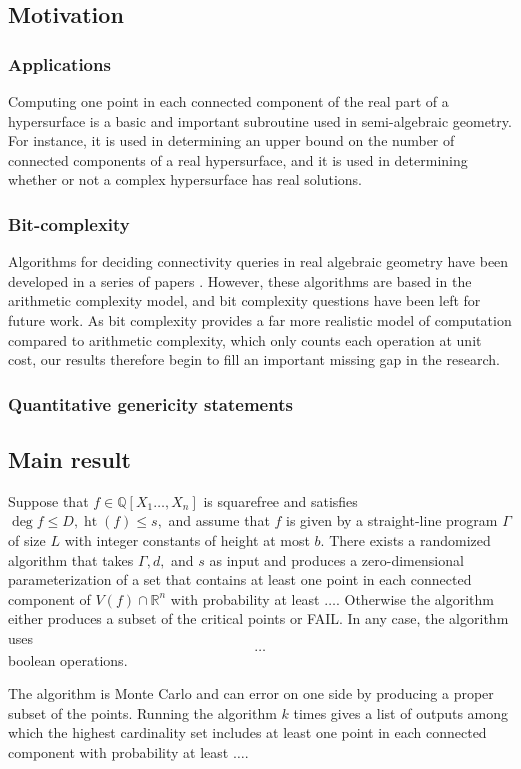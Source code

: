 \documentclass[sigconf]{acmart}
\DeclareMathOperator{\htt}{ht}
\def\Q{\mathbb{Q}}
\def\R{\mathbb{R}}
\begin{document}
\subsection{Motivation}
%
\subsubsection{Applications}
%
Computing one point in each connected component of the real part of a hypersurface is a basic and important subroutine used in semi-algebraic geometry. For instance, it is used in determining an upper bound on the number of connected components of a real hypersurface, and it is used in determining whether or not a complex hypersurface has real solutions. 
\subsubsection{Bit-complexity}
Algorithms for deciding connectivity queries in real algebraic geometry have been developed in a series of papers \cite{a,b,c,d}. However, these algorithms are based in the arithmetic complexity model, and bit complexity questions have been left for future work. As bit complexity provides a far more realistic model of computation compared to arithmetic complexity,  which only counts each operation at unit cost, our results therefore begin to fill an important missing gap in the research. 
\subsubsection{Quantitative genericity statements}
%
\subsection{Main result}
%
\begin{theorem}
Suppose that $f\in\Q[X_1\hdots,X_n]$ is squarefree and satisfies $\deg f \leq D, \htt(f) \leq s,$ and assume that $f$ is given by a straight-line program $\Gamma$ of size $L$ with integer constants of height at most $b.$ There exists a randomized algorithm that takes $\Gamma, d,$ and $s$ as input and produces a zero-dimensional parameterization of a set that contains at least one point in each connected component of $V(f) \cap \R^n$ with probability at least $\hdots$. Otherwise the algorithm either produces a subset of the critical points or FAIL. In any case, the algorithm uses 
\[
\hdots  
\]
boolean operations.
\end{theorem}
%
The algorithm is Monte Carlo and can error on one side by producing a proper subset of the points. Running the algorithm $k$ times gives a list of outputs among which the highest cardinality set includes at least one point in each connected component with probability at least $\hdots.$
%
%
%
%
\end{document}
